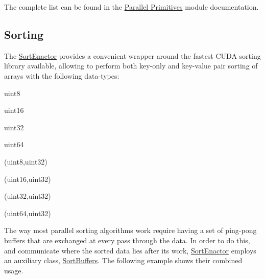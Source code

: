 \begin{DoxyParagraph}{}
The complete list can be found in the \hyperlink{group___primitives}{Parallel Primitives} module documentation. 
\end{DoxyParagraph}
\hypertarget{sorting_page}{}\subsection{Sorting}\label{sorting_page}
\begin{DoxyParagraph}{}
The \hyperlink{structcugar_1_1cuda_1_1_sort_enactor}{Sort\+Enactor} provides a convenient wrapper around the fastest C\+U\+DA sorting library available, allowing to perform both key-\/only and key-\/value pair sorting of arrays with the following data-\/types\+: 
\end{DoxyParagraph}
\begin{DoxyParagraph}{}

\begin{DoxyItemize}
\item uint8
\item uint16
\item uint32
\item uint64
\item (uint8,uint32)
\item (uint16,uint32)
\item (uint32,uint32)
\item (uint64,uint32) 
\end{DoxyItemize}
\end{DoxyParagraph}
\begin{DoxyParagraph}{}
The way most parallel sorting algorithms work require having a set of ping-\/pong buffers that are exchanged at every pass through the data. In order to do this, and communicate where the sorted data lies after its work, \hyperlink{structcugar_1_1cuda_1_1_sort_enactor}{Sort\+Enactor} employs an auxiliary class, \hyperlink{structcugar_1_1cuda_1_1_sort_buffers}{Sort\+Buffers}. The following example shows their combined usage.
\end{DoxyParagraph}

